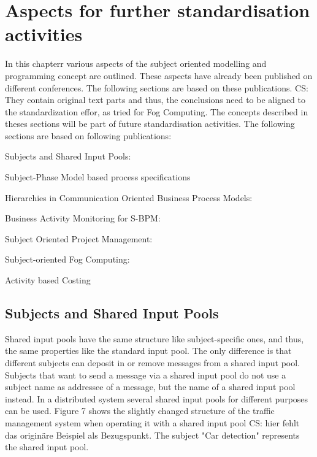 
\chapter{Aspects for further standardisation activities}


In this chapterr various aspects of the subject oriented modelling and programming concept are outlined. These aspects have already been published on different conferences. The following sections are based on these publications. CS: They contain original text parts and thus, the conclusions need to be aligned to the standardization effor, as tried for Fog Computing.
The concepts described in theses sections will be part of future standardisation activities.
The following sections are based on following publications:\\
\begin{list}{-}
	\item Subjects and Shared Input Pools: \cite{article:SharedInputPool}
	\item Subject-Phase Model based process specifications \cite{article:SubjectPhase}
	\item Hierarchies in Communication Oriented Business Process Models: \cite{article:Subject-hierarchies}
	\item Business Activity Monitoring for S-BPM: \cite{article:SubProcessMon}
	\item Subject Oriented Project Management: \cite{article:Subject-Oriented-Project-Management}
	\item Subject-oriented Fog Computing: \cite{article:FogComp}
	\item Activity based Costing \cite{article:SBPMCosting}
\end{list}

\section{Subjects and Shared Input Pools}

Shared input pools have the same structure like subject-specific ones, and thus, the same properties like the standard input pool. The only difference is that different subjects can deposit in or remove messages from a shared input pool. Subjects that want to send a message via a shared input pool do not use a subject name as addressee of a message, but the name of a shared input pool instead. In a distributed system several shared input pools for different purposes can be used. Figure 7 shows the slightly changed structure of the traffic management system when operating it with a shared input pool CS: hier fehlt das originäre Beispiel als Bezugspunkt. The subject "Car detection" represents the shared input pool.


